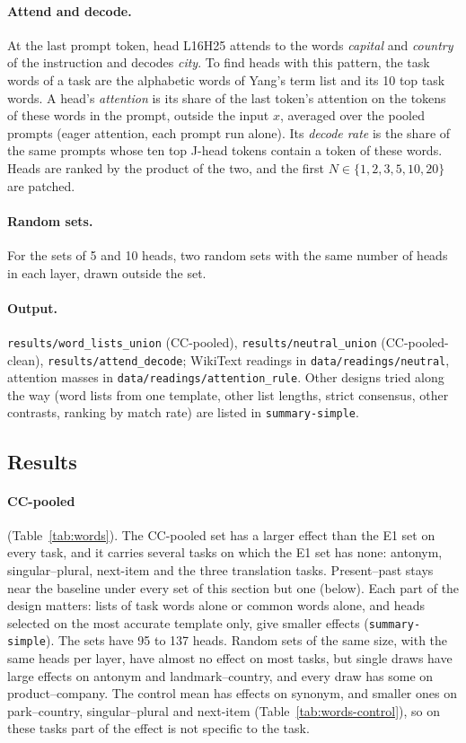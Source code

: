 \documentclass[11pt,a4paper]{article}
\begin{document}
\paragraph{Attend and decode.} At the last prompt token, head L16H25 attends to the words \emph{capital} and \emph{country} of the instruction and decodes \emph{city}. To find heads with this pattern, the task words of a task are the alphabetic words of Yang's term list and its 10 top task words. A head's \emph{attention} is its share of the last token's attention on the tokens of these words in the prompt, outside the input $x$, averaged over the pooled prompts (eager attention, each prompt run alone). Its \emph{decode rate} is the share of the same prompts whose ten top J-head tokens contain a token of these words. Heads are ranked by the product of the two, and the first $N\in\{1,2,3,5,10,20\}$ are patched.

\paragraph{Random sets.} For the sets of 5 and 10 heads, two random sets with the same number of heads in each layer, drawn outside the set.

\begin{sloppypar}\paragraph{Output.} \texttt{results/word\_lists\_union} (CC-pooled), \texttt{results/neutral\_union} (CC-pooled-clean), \texttt{results/attend\_decode}; WikiText readings in \texttt{data/readings/neutral}, attention masses in \texttt{data/readings/attention\_rule}. Other designs tried along the way (word lists from one template, other list lengths, strict consensus, other contrasts, ranking by match rate) are listed in \texttt{summary-simple}.\end{sloppypar}

\subsection{Results}\label{sec:res-words}
\paragraph{CC-pooled} (Table~\ref{tab:words}). The CC-pooled set has a larger effect than the E1 set on every task, and it carries several tasks on which the E1 set has none: antonym, singular--plural, next-item and the three translation tasks. Present--past stays near the baseline under every set of this section but one (below). Each part of the design matters: lists of task words alone or common words alone, and heads selected on the most accurate template only, give smaller effects (\texttt{summary-simple}). The sets have 95 to 137 heads. Random sets of the same size, with the same heads per layer, have almost no effect on most tasks, but single draws have large effects on antonym and landmark--country, and every draw has some on product--company. The control mean has effects on synonym, and smaller ones on park--country, singular--plural and next-item (Table~\ref{tab:words-control}), so on these tasks part of the effect is not specific to the task.
\end{document}
